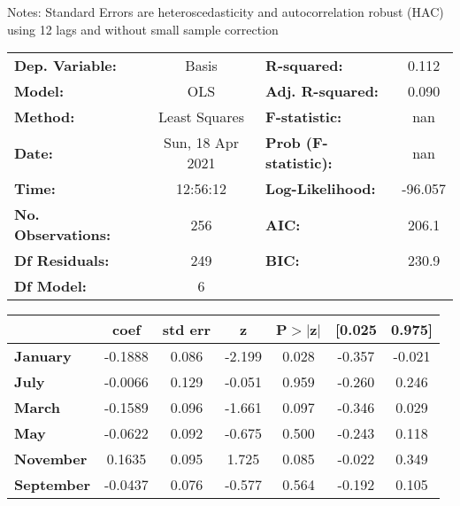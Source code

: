 Notes: \newline
 [1] Standard Errors are heteroscedasticity and autocorrelation robust (HAC) using 12 lags and without small sample correction
\begin{center}
\begin{tabular}{lclc}
\toprule
\textbf{Dep. Variable:}    &      Basis       & \textbf{  R-squared:         } &     0.112   \\
\textbf{Model:}            &       OLS        & \textbf{  Adj. R-squared:    } &     0.090   \\
\textbf{Method:}           &  Least Squares   & \textbf{  F-statistic:       } &       nan   \\
\textbf{Date:}             & Sun, 18 Apr 2021 & \textbf{  Prob (F-statistic):} &      nan    \\
\textbf{Time:}             &     12:56:12     & \textbf{  Log-Likelihood:    } &   -96.057   \\
\textbf{No. Observations:} &         256      & \textbf{  AIC:               } &     206.1   \\
\textbf{Df Residuals:}     &         249      & \textbf{  BIC:               } &     230.9   \\
\textbf{Df Model:}         &           6      & \textbf{                     } &             \\
\bottomrule
\end{tabular}
\begin{tabular}{lcccccc}
                   & \textbf{coef} & \textbf{std err} & \textbf{z} & \textbf{P$> |$z$|$} & \textbf{[0.025} & \textbf{0.975]}  \\
\midrule
\textbf{January}   &      -0.1888  &        0.086     &    -2.199  &         0.028        &       -0.357    &       -0.021     \\
\textbf{July}      &      -0.0066  &        0.129     &    -0.051  &         0.959        &       -0.260    &        0.246     \\
\textbf{March}     &      -0.1589  &        0.096     &    -1.661  &         0.097        &       -0.346    &        0.029     \\
\textbf{May}       &      -0.0622  &        0.092     &    -0.675  &         0.500        &       -0.243    &        0.118     \\
\textbf{November}  &       0.1635  &        0.095     &     1.725  &         0.085        &       -0.022    &        0.349     \\
\textbf{September} &      -0.0437  &        0.076     &    -0.577  &         0.564        &       -0.192    &        0.105     \\

\end{tabular}
\end{center}
